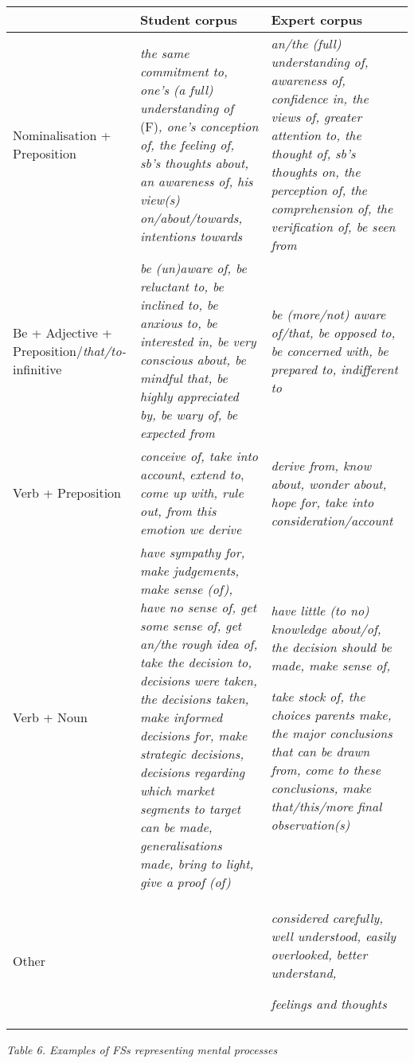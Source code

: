 \begin{center}
\tablefirsthead{}
\tablehead{}
\tabletail{}
\tablelasttail{}
\begin{supertabular}{m{1.3670598in}m{1.5538598in}m{1.5629599in}}
\hline
 &
Student corpus &
Expert corpus\\\hline
Nominalisation + Preposition &
\textit{the same commitment to, one’s (a full) understanding of }(F)\textit{, one’s conception of, the feeling of, sb’s thoughts about, an awareness of, his view(s) on/about/towards, intentions towards} &
\textit{an/the (full) understanding of, awareness of, confidence in, the views of, greater attention to, the thought of, sb’s thoughts on, the perception of, the comprehension of, the verification of, be seen from}\\\hline
Be + Adjective + Preposition/\textit{that/to-}infinitive &
\textit{be (un)aware of, be reluctant to, be inclined to, be anxious to, be interested in, be very conscious about, be mindful that, be highly appreciated by, be wary of, be expected from} &
\textit{be (more/not) aware of/that, be opposed to, be concerned with, be prepared to, indifferent to}\\\hline
Verb + Preposition  &
\textit{conceive of, take into account}, \textit{extend to}, \textit{come up with, rule out, from this emotion we derive} &
\textit{derive from, know about, wonder about, hope for, take into consideration/account}\\\hline
Verb + Noun &
\textit{have sympathy for, make judgements, make sense (of), have no sense of, get some sense of, get an/the rough idea of, take the decision to, decisions were taken, the decisions taken, make informed decisions for, make strategic decisions, decisions regarding which market segments to target can be made, generalisations made, bring to light, give a proof (of)} &
\textit{have little (to no) knowledge about/of, the decision should be made, make sense of,}

\textit{take stock of, the choices parents make, the major conclusions that can be drawn from, come to these conclusions, make that/this/more final observation(s)}\\\hline
Other &
 &
\textit{considered carefully, well understood, easily overlooked, better understand,}

\textit{feelings and thoughts}\\\hline
\end{supertabular}
\end{center}
\begin{styleStandard}
\textit{Table 6. Examples of FSs representing mental processes}
\end{styleStandard}

